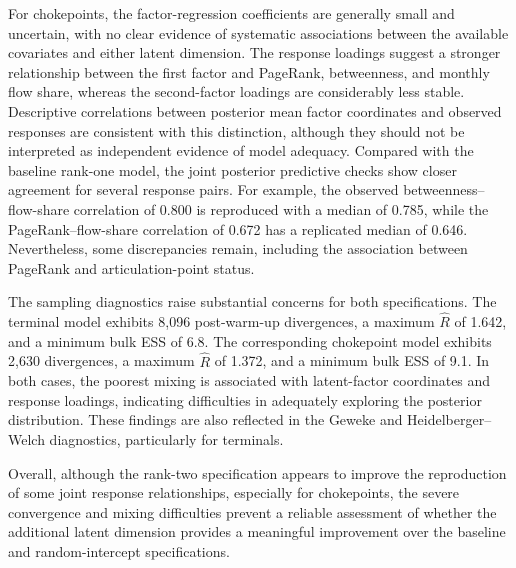 \documentclass[pdftex,12pt,openright,a4paper,oneside]{book}
\begin{document}
For chokepoints, the factor-regression coefficients are generally small and uncertain, with no clear evidence of systematic associations between the available covariates and either latent dimension. The response loadings suggest a stronger relationship between the first factor and PageRank, betweenness, and monthly flow share, whereas the second-factor loadings are considerably less stable. Descriptive correlations between posterior mean factor coordinates and observed responses are consistent with this distinction, although they should not be interpreted as independent evidence of model adequacy. Compared with the baseline rank-one model, the joint posterior predictive checks show closer agreement for several response pairs. For example, the observed betweenness–flow-share correlation of 0.800 is reproduced with a median of 0.785, while the PageRank–flow-share correlation of 0.672 has a replicated median of 0.646. Nevertheless, some discrepancies remain, including the association between PageRank and articulation-point status.

The sampling diagnostics raise substantial concerns for both specifications. The terminal model exhibits 8,096 post-warm-up divergences, a maximum $\widehat{R}$ of 1.642, and a minimum bulk ESS of 6.8. The corresponding chokepoint model exhibits 2,630 divergences, a maximum $\widehat{R}$ of 1.372, and a minimum bulk ESS of 9.1. In both cases, the poorest mixing is associated with latent-factor coordinates and response loadings, indicating difficulties in adequately exploring the posterior distribution. These findings are also reflected in the Geweke and Heidelberger--Welch diagnostics, particularly for terminals.

Overall, although the rank-two specification appears to improve the reproduction of some joint response relationships, especially for chokepoints, the severe convergence and mixing difficulties prevent a reliable assessment of whether the additional latent dimension provides a meaningful improvement over the baseline and random-intercept specifications.
\end{document}
